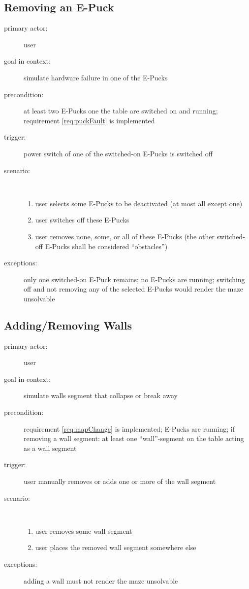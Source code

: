\documentclass[a4paper,parskip,headheight=38pt]{scrartcl} %
\begin{document}
\subsection{Removing an E-Puck}
\begin{description}
\item[primary actor:] user
\item[goal in context:] simulate hardware failure in one of the E-Pucks
\item[precondition:] at least two E-Pucks one the table are switched on and running; requirement \ref{req:puckFault} is implemented
\item[trigger:] power switch of one of the switched-on E-Pucks is switched off
\item[scenario:] \ 
\begin{enumerate}
	\item user selects some E-Pucks to be deactivated (at most all except one)
	\item user switches off these E-Pucks
	\item user removes none, some, or all of these E-Pucks (the other switched-off E-Pucks shall be considered \enquote{obstacles})
\end{enumerate}
\item[exceptions:] only one switched-on E-Puck remains; no E-Pucks are running; switching off and not removing any of the selected E-Pucks would render the maze unsolvable
\end{description}

\subsection{Adding/Removing Walls}
\begin{description}
\item[primary actor:] user
\item[goal in context:] simulate walls segment that collapse or break away
\item[precondition:] requirement \ref{req:mapChange} is implemented; E-Pucks are running; if removing a wall segment: at least one \enquote{wall}-segment on the table acting as a wall segment
\item[trigger:] user manually removes or adds one or more of the wall segment
\item[scenario:] \ 
\begin{enumerate}
	\item user removes some wall segment
	\item user places the removed wall segment somewhere else
\end{enumerate}
\item[exceptions:] adding a wall must not render the maze unsolvable
\end{description}
\end{document}
